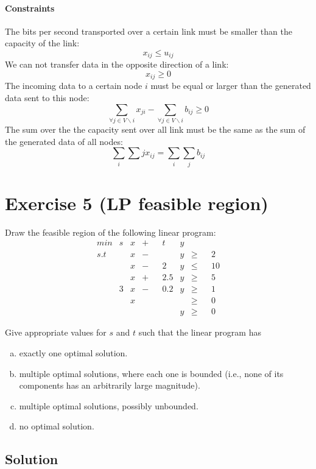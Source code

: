 \documentclass[a4paper, 12pt]{report}
\begin{document}
\paragraph{Constraints} The bits per second transported over a certain link
must be smaller than the capacity of the link:
\[
    x_{ij} ≤ u_{ij}
\]
We can not transfer data in the opposite direction of a link:
\[
    x_{ij} ≥ 0
\]
The incoming data to a certain node $i$ must be equal or larger than the
generated data sent to this node:
\[
    ∑_{∀j ∈ V∖i} x_{ji} - ∑_{∀j ∈ V∖i} b_{ij} ≥ 0
\]
The sum over the the capacity sent over all link must be the same as the sum of
the generated data of all nodes:
\[
    ∑_{i}∑{j}x_{ij} = ∑_{i}∑_{j}b_{ij}
\]

\section{Exercise 5 (LP feasible region)}

Draw the feasible region of the following linear program:
\begin{align*}
   & min &    s & x    & + &    & t   & y    &   &    &    &\\
   & s.t &      & x    & − &    &     & y    & ≥ &    & 2  &\\
   &     &      & x    & − &    & 2   & y    & ≤ &    & 10 &\\
   &     &      & x    & + &    & 2.5 & y    & ≥ &    & 5  &\\
   &     &    3 & x    & − &    & 0.2 & y    & ≥ &    & 1  &\\
   &     &      & x    &   &    &     &      & ≥ &    & 0  &\\
   &     &      &      &   &    &     & y    & ≥ &    & 0  &
\end{align*}

Give appropriate values for $s$ and $t$ such that the linear program has

\begin{enumerate}[(a)]
    \item exactly one optimal solution.
    \item multiple optimal solutions, where each one is bounded (i.e., none of
          its components has an arbitrarily large magnitude).
    \item multiple optimal solutions, possibly unbounded.
    \item no optimal solution.
\end{enumerate}

\subsection{Solution}
\end{document}
